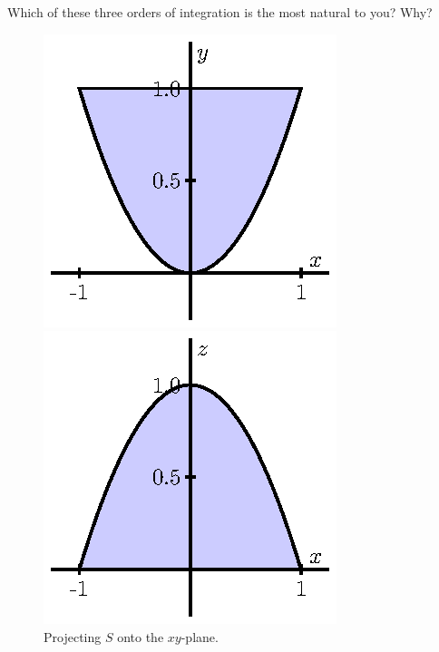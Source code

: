 \begin{exercises}
	\item Which of these three orders of integration is the most natural to you?  Why?

	\ea

\begin{figure}[ht]
\begin{center}
\begin{minipage}{1.75in}
\begin{center}
  \includegraphics{figures/fig_11_7_solid_proj_1.eps}
\end{center}
\caption{Projecting $S$ onto the $xy$-plane.}
\label{F:11.7.TI_Example_2_xy}
\end{minipage} \hspace{0.1in}
\begin{minipage}{1.75in}
\begin{center}
  \includegraphics{figures/fig_11_7_solid_proj_2.eps}

\end{center}
\end{minipage}
\end{center}
\end{figure}
\end{exercises}
